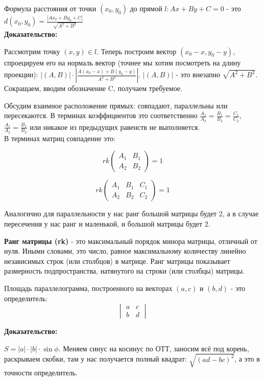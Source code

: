 \documentclass[12pt]{article}
\begin{document}
\begin{theorembox}
Формула расстояния от точки $(x_0, y_0)$ до прямой $l: Ax + By + C = 0$ - это $d(x_0, y_0) = \frac{|Ax_0 + By_0 + C|}{\sqrt{A^2 + B^2}}$\\

\textbf{Доказательство:}

Рассмотрим точку $(x, y) \in l$. Теперь построим вектор $(x_0 - x, y_0 - y)$, спроецируем его на нормаль вектор (точнее мы хотим посмотреть на длину проекции): $|(A, B)| \cdot |\frac{A(x_0 - x) + B(y_0 - y)}{A^2 + B^2}|$. $|(A, B)|$ - это внезапно $\sqrt{A^2 + B^2}$. Сокращаем, вводим обозначение C, получаем требуемое.
\end{theorembox}

\begin{remarkbox}
Обсудим взаимное расположение прямых: совпадают, параллельны или пересекаются. В терминах коэффициентов это соответственно $\frac{A_1}{A_2} = \frac{B_1}{B_2} = \frac{C_1}{C_2}$, $\frac{A_1}{A_2} = \frac{B_1}{B_2}$ или никакое из предыдущих равенств не выполняется.\\

В терминах матриц совпадение это:

\[
rk \begin{pmatrix}
A_1 & B_1\\
A_2 & B_2
\end{pmatrix}
 = 1\]

\[
rk \begin{pmatrix}
A_1 & B_1 & C_1\\
A_2 & B_2 & C_2
\end{pmatrix}
 = 1\]

Аналогично для параллельности у нас ранг большой матрицы будет 2, а в случае пересечения у нас ранг и маленькой, и большой матрицы будет 2.

\end{remarkbox}

\begin{definitionbox}
    \textbf{Ранг матрицы (rk)} - это максимальный порядок минора матрицы, отличный от нуля. Иными словами, это число, равное максимальному количеству линейно независимых строк (или столбцов) в матрице. Ранг матрицы показывает размерность подпространства, натянутого на строки (или столбцы) матрицы.
\end{definitionbox}

\begin{theorembox}
Площадь параллелограмма, построенного на векторах $(a, c)$ и $(b, d)$ - это определитель:
\[
\begin{vmatrix}
a & c\\
b & d
\end{vmatrix}
\]

\textbf{Доказательство:}

$S = |a| \cdot |b| \cdot \sin{\phi}$. Меняем синус на косинус по ОТТ, заносим всё под корень, раскрываем скобки, там у нас получается полный квадрат: $\sqrt{(ad - bc)^2}$, а это в точности определитель.
\end{theorembox}
\end{document}
